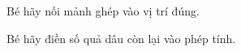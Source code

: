 \documentclass[../main.tex]{subfiles}
\begin{document}
\begin{bt}
    Bé hãy nối mảnh ghép vào vị trí đúng.
\end{bt}

\begin{bt}
    Bé hãy điền số quả dâu còn lại vào phép tính.
    \TTbatdauhinh
    {\centering
        \\[8pt]
        \\[8pt]
        \\[8pt]
        \\[8pt]
        \\[8pt]
        \par}
\end{bt}
\end{document}
